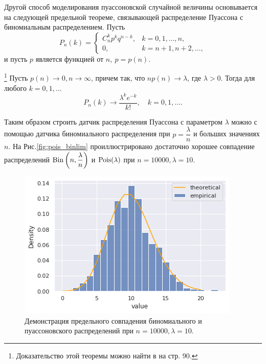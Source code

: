 Другой способ моделирования пуассоновской случайной величины основывается на 
 следующей предельной теореме, связывающей распределение Пуассона с биномиальным
 распределением.
Пусть
$$
P_n(k) = 
\begin{cases}
	C_n^k p^k q^{n-k}, & k = 0, 1, \dots, n,\\
	0, & k = n + 1, n + 2, \dots, 
\end{cases}
$$
и пусть $ p $ является функцией от $ n, \ p = p(n) $.
\begin{theorem}[Пуассона]\footnote{Доказательство этой теоремы можно найти в
	 \cite{shir_prob} на стр. 90.}
	Пусть $ p(n) \to 0, n \to \infty $, причем так, что $ n p(n) \to \lambda $,
	 где $ \lambda > 0 $. Тогда для любого $ k = 0, 1, \dots $
	$$
	P_n(k) \to \dfrac{\lambda^k e^{-k}}{k!}, \quad k = 0, 1, \dots .
	$$
\end{theorem}
Таким образом строить датчик распределения Пуассона с параметром $ \lambda $
 можно с помощью датчика биномиального распределения при $ p =
 \dfrac{\lambda}{n} $ и больших значениях $ n $. На Рис.\eqref{fig:pois_binlim}
 проиллюстрировано достаточно хорошее совпадение распределений $ \operatorname{\mathrm{Bin}}\left( n,
 \dfrac{\lambda}{n} \right) $ и $ \operatorname{\mathrm{Pois}}(\lambda) $ при $ n = 10000, \lambda = 10 $.

\begin{figure}[ht]
	\centering
	\includegraphics[width = 0.7\linewidth]{"./resources/pois_binlim.png"}
	\caption{Демонстрация предельного совпадения биномиального и пуассоновского
	 распределений при $ n = 10000, \lambda = 10 $.}
    \label{fig:pois_binlim}
\end{figure}

